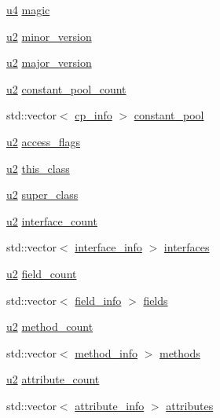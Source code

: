 \begin{DoxyCompactItemize}
\item 
\hyperlink{types_8h_af3b2d4b29fd9faedc984db3e062b3d5d}{u4} \hyperlink{classClassFileImpl_a31b4b986030442ae22f0630532032ded}{magic}
\item 
\hyperlink{types_8h_ae676e9207f57fb921dca7366b2f59c53}{u2} \hyperlink{classClassFileImpl_abec30809bc428ce5e31eebcd60a166e1}{minor\+\_\+version}
\item 
\hyperlink{types_8h_ae676e9207f57fb921dca7366b2f59c53}{u2} \hyperlink{classClassFileImpl_ac48ee85570e9e8b06f7a568a4246c2da}{major\+\_\+version}
\item 
\hyperlink{types_8h_ae676e9207f57fb921dca7366b2f59c53}{u2} \hyperlink{classClassFileImpl_ad1cf3a358e54bf290b8602808f2d3a0b}{constant\+\_\+pool\+\_\+count}
\item 
std\+::vector$<$ \hyperlink{structcp__info}{cp\+\_\+info} $>$ \hyperlink{classClassFileImpl_ac3a364b19cfd1a647309dcf385e8d064}{constant\+\_\+pool}
\item 
\hyperlink{types_8h_ae676e9207f57fb921dca7366b2f59c53}{u2} \hyperlink{classClassFileImpl_ae7bcc5b644d2164290c53a8727d36fb0}{access\+\_\+flags}
\item 
\hyperlink{types_8h_ae676e9207f57fb921dca7366b2f59c53}{u2} \hyperlink{classClassFileImpl_a63d984dbdc45e796e6599e2c0b982f36}{this\+\_\+class}
\item 
\hyperlink{types_8h_ae676e9207f57fb921dca7366b2f59c53}{u2} \hyperlink{classClassFileImpl_aa85098174076217a362065cbf00d804b}{super\+\_\+class}
\item 
\hyperlink{types_8h_ae676e9207f57fb921dca7366b2f59c53}{u2} \hyperlink{classClassFileImpl_ae8948beaa9ebac1d5df2c73ec62602c8}{interface\+\_\+count}
\item 
std\+::vector$<$ \hyperlink{structinterface__info}{interface\+\_\+info} $>$ \hyperlink{classClassFileImpl_a449222435f48682e0f680432cf03f49b}{interfaces}
\item 
\hyperlink{types_8h_ae676e9207f57fb921dca7366b2f59c53}{u2} \hyperlink{classClassFileImpl_a0144ff86144e3548e32779faf4e0dab9}{field\+\_\+count}
\item 
std\+::vector$<$ \hyperlink{structfield__info}{field\+\_\+info} $>$ \hyperlink{classClassFileImpl_af0ba1073f7566cdb21c47d33198ecab0}{fields}
\item 
\hyperlink{types_8h_ae676e9207f57fb921dca7366b2f59c53}{u2} \hyperlink{classClassFileImpl_a9643bb90606a32fa3f4a35f2ff468e5b}{method\+\_\+count}
\item 
std\+::vector$<$ \hyperlink{structmethod__info}{method\+\_\+info} $>$ \hyperlink{classClassFileImpl_a9142d753fc1a3b06ce26606506b2e9c1}{methods}
\item 
\hyperlink{types_8h_ae676e9207f57fb921dca7366b2f59c53}{u2} \hyperlink{classClassFileImpl_ac1085cebfdbb8a2469d9de9782d0576d}{attribute\+\_\+count}
\item 
std\+::vector$<$ \hyperlink{structattribute__info}{attribute\+\_\+info} $>$ \hyperlink{classClassFileImpl_a25689268cd6201a1b970a6dd41ac6fce}{attributes}
\end{DoxyCompactItemize}


